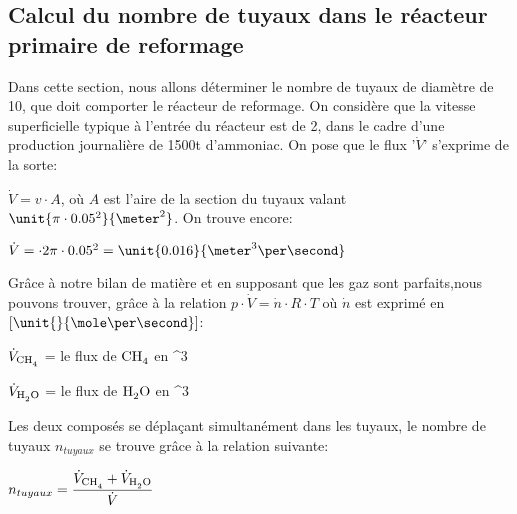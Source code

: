 
\subsection{Calcul du nombre de tuyaux dans le réacteur primaire de reformage}

Dans cette section, nous allons déterminer le nombre de tuyaux de diamètre de \unit{10}{\centi\meter}, que doit comporter le réacteur de reformage. On considère que la vitesse superficielle typique à l'entrée du réacteur est de \unit{2}{\meter\per\second}, dans le cadre d'une production journalière de \unit{1500}{t} d'ammoniac. On pose que le flux '$\dot{V}$' s'exprime de la sorte:

$\dot{V} = v \cdot A$, où $A$ est l'aire de la section du tuyaux valant $\unit{\pi \cdot 0.05^2}{\meter ^2}$. On trouve encore:

$\dot{V} = \cdot 2 \pi \cdot 0.05^2 = \unit{0.016}{\meter ^3 \per\second}$

Grâce à notre bilan de matière et en supposant que les gaz sont parfaits,nous pouvons trouver, grâce à la relation $p\cdot \dot{V}=\dot{n} \cdot R\cdot T$
où $\dot{n}$ est exprimé en $[\unit{}{\mole\per\second}]$:

$\dot{V}_{\ce{CH_4}}$ = le flux de $\ce{CH_4}$ en \unit{}{\meter ^3 \per\second}

$\dot{V}_{\ce{H_2O}}$ = le flux de $\ce{H_2O}$ en \unit{}{\meter ^3 \per\second}

Les deux composés se déplaçant simultanément dans les tuyaux, le nombre de tuyaux $n_{tuyaux}$ se trouve grâce à la relation suivante:

$n_{tuyaux} = \dfrac{\dot{V}_{\ce{CH_4}} + \dot{V}_{\ce{H_2O}}}{\dot{V}}$

